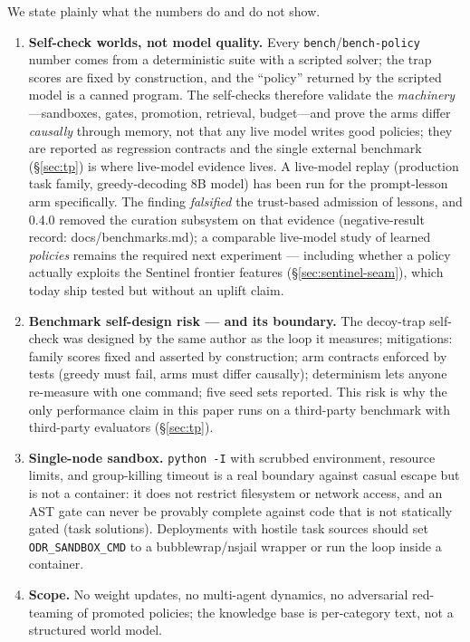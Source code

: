 \documentclass[11pt,a4paper]{article}
\newcommand{\hdr}[1]{\textbf{#1}}
\begin{document}
We state plainly what the numbers do and do not show.
\begin{enumerate}
  \item \hdr{Self-check worlds, not model quality.} Every
  \texttt{bench}/\texttt{bench-policy} number comes from a deterministic
  suite with a scripted solver; the trap scores are
  fixed by construction, and the ``policy'' returned by the scripted model
  is a canned program. The self-checks
  therefore validate the \emph{machinery}---sandboxes, gates, promotion,
  retrieval, budget---and prove the arms differ \emph{causally} through
  memory, not that any live model writes good policies; they are
  reported as regression contracts and the single external benchmark
  (\S\ref{sec:tp}) is where live-model evidence lives. A
  live-model replay (production task family, greedy-decoding 8B model) has
  been run for the prompt-lesson arm specifically. The finding
  \emph{falsified} the trust-based admission of lessons, and 0.4.0 removed
  the curation subsystem on that evidence (negative-result record:
  docs/benchmarks.md); a comparable
  live-model study of learned \emph{policies} remains the required next
  experiment --- including whether a policy actually exploits the Sentinel
  frontier features (\S\ref{sec:sentinel-seam}), which today ship tested
  but without an uplift claim.
  \item \hdr{Benchmark self-design risk --- and its boundary.} The
  decoy-trap self-check was designed by the same author as the loop it
  measures; mitigations: family scores fixed and asserted by construction;
  arm contracts enforced by tests (greedy must
  fail, arms must differ causally); determinism lets anyone re-measure with
  one command; five seed sets reported. This risk is why the only
  performance claim in this paper runs on a third-party benchmark with
  third-party evaluators (\S\ref{sec:tp}).
  \item \hdr{Single-node sandbox.} \texttt{python -I} with scrubbed environment,
  resource limits, and group-killing timeout is a real boundary against casual
  escape but is not a container: it does not restrict filesystem or network
  access, and an AST gate can never be provably complete against code that is
  not statically gated (task solutions). Deployments with hostile task sources
  should set \texttt{ODR\_SANDBOX\_CMD} to a bubblewrap/nsjail wrapper or run
  the loop inside a container.
  \item \hdr{Scope.} No weight updates, no multi-agent dynamics, no adversarial
  red-teaming of promoted policies; the knowledge base is per-category text,
  not a structured world model.
\end{enumerate}
\end{document}
